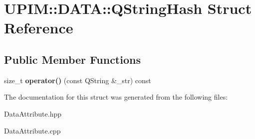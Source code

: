 \hypertarget{structUPIM_1_1DATA_1_1QStringHash}{}\section{U\+P\+IM\+:\+:D\+A\+TA\+:\+:Q\+String\+Hash Struct Reference}
\label{structUPIM_1_1DATA_1_1QStringHash}
\subsection*{Public Member Functions}
\begin{DoxyCompactItemize}
\item 
\mbox{\label{structUPIM_1_1DATA_1_1QStringHash_acd18dd02f906674b1563a40550d00c58}} 
size\+\_\+t {\bfseries operator()} (const Q\+String \&\+\_\+str) const
\end{DoxyCompactItemize}


The documentation for this struct was generated from the following files\+:\begin{DoxyCompactItemize}
\item 
Data\+Attribute.\+hpp\item 
Data\+Attribute.\+cpp\end{DoxyCompactItemize}

